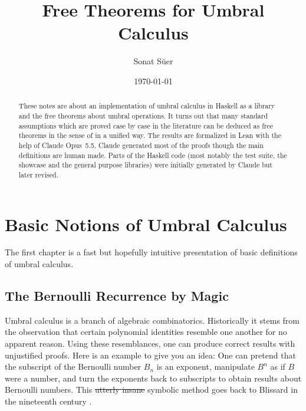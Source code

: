 \documentclass[11pt,a4paper]{report}
\title{Free Theorems for Umbral Calculus}
\author{Sonat S\"uer}
\date{\today}
\theoremstyle{plain}
\theoremstyle{definition}
\theoremstyle{remark}
\begin{document}
\maketitle

\begin{abstract}
These notes are about an implementation of umbral calculus in Haskell as a library and 
the free theorems about umbral operations. It turns out that many standard assumptions which are proved
case by case in the literature can be deduced as free theorems in the sense of \cite{Wadler1989} in a unified way. The results are
formalized in Lean with the help of Claude Opus~5.5. Claude generated most of the proofs though the
main definitions are human made. Parts of the Haskell code (most notably the test suite, the showcase 
and the general purpose libraries) were initially generated by Claude but later revised.
\end{abstract}

\tableofcontents

\chapter{Basic Notions of Umbral Calculus}
\label{ch:intro}

The first chapter is a fast but hopefully intuitive presentation of basic 
definitions of umbral calculus.  

\section{The Bernoulli Recurrence by Magic}
\label{sec:blissard}

Umbral calculus is a branch of algebraic combinatorics. Historically it stems from
the observation that certain polynomial identities resemble one another for no
apparent reason. Using these resemblances, one can produce correct results with unjustified proofs.
Here is an example to give you an idea: One can pretend that the subscript of the Bernoulli
number $B_n$ is an exponent, manipulate $B^n$ as if $B$ were a number,
and turn the exponents back to subscripts to obtain results about Bernoulli numbers. This \sout{utterly insane}
symbolic method goes back to Blissard in the nineteenth century \cite{Blissard1861}. 
\end{document}
